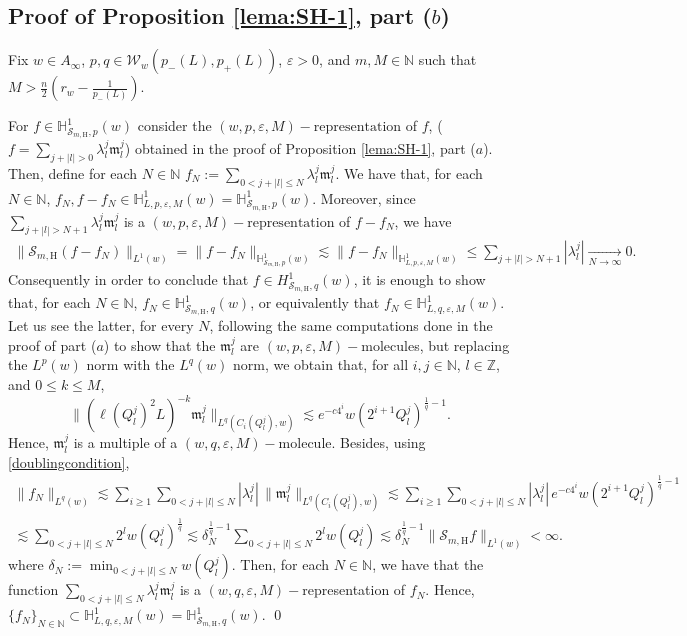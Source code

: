 \documentclass[11pt, a4paper,leqno]{amsart}
\newcommand{\mm}{\mathfrak{m}}
\theoremstyle{plain}
\theoremstyle{definition}
\theoremstyle{remark}
\numberwithin{equation}{section}
\def \N{ \mathbb{N} }
\def \Z{ \mathbb{Z} }
\def \Scal{ \mathcal{S} }
\def \hh{ \mathrm{H} }
\def \mol{ (w,p,\varepsilon,M)-\textrm{molecule}}
\def \p{ (w,p,\varepsilon,M)-\textrm{representation}}
\begin{document}

\subsection{Proof of Proposition \ref{lema:SH-1}, part ($b$)}
Fix $w\in A_{\infty}$, $p,q\in \mathcal{W}_w(p_-(L),p_+(L))$, $\varepsilon>0$, and $m,M\in \N$
such that $M>\frac{n}{2}\left(r_w-\frac{1}{p_-(L)}\right)$.

For $f\in \mathbb{H}^1_{\Scal_{m,\hh},p}(w)$ consider the 
$\p$ of $f$, ($f=\sum_{j+|l|>0}\lambda_l^j\mm_l^j$)
obtained in the proof of Proposition \ref{lema:SH-1}, part ($a$). Then, define for each $N\in \N$
$
f_N:=\sum_{0<j+|l|\leq N}\lambda_l^j\mm_l^j.
$
We have that, for each $N\in \N$, $f_N, f-f_N\in \mathbb{H}^1_{L,p,\varepsilon,M}(w)=\mathbb{H}^1_{\Scal_{m,\hh},p}(w)$. Moreover, since
$\sum_{j+|l|>N+1}\lambda_l^j\mm_l^j$ is a $\p$ of $f-f_N$, we have
\begin{align*}
\|\Scal_{m,\hh}(f-f_N)\|_{L^1(w)}=\|f-f_N\|_{\mathbb{H}^1_{\Scal_{m,\hh},p}(w)}
\lesssim\|f-f_N\|_{\mathbb{H}^1_{L,p,\varepsilon,M}(w)}\leq \sum_{j+|l|>N+1}|\lambda_l^j|\mathop{\longrightarrow}\limits_{N\rightarrow \infty} 0.
\end{align*}
Consequently in order to conclude that $f\in H^1_{\Scal_{m,\hh},q}(w)$, it is enough to show that, for each $N\in \N$, $f_N\in \mathbb{H}^1_{\Scal_{m,\hh},q}(w)$, or equivalently that $f_N\in \mathbb{H}^1_{L,q,\varepsilon,M}(w)$. Let us see the latter,  
for every $N$,  following the same computations done in the proof of part ($a$) to show that the $\mm_l^j$ are $\mol$s, but replacing the $L^p(w)$ norm with the $L^q(w)$ norm, we obtain that, for all $i,j\in \N$, $l\in \Z$, and $0\leq k\leq M$,
$$
\|(\ell(Q_l^j)^2L)^{-k}\mm_l^j\|_{L^q(C_i(Q_l^j),w)}\lesssim e^{-c4^i}w(2^{i+1}Q_l^j)^{\frac{1}{q}-1}.
$$
Hence,  $\mm_l^j$ is a multiple of a $(w,q,\varepsilon,M)-$molecule.
Besides, using \eqref{doublingcondition},
\begin{multline*}
\|f_N\|_{L^q(w)}\lesssim \sum_{i\geq 1}\sum_{0<j+|l|\leq N}|\lambda_l^j|\,\|\mm_l^j\|_{L^q(C_i(Q_l^j),w)}
\lesssim
\sum_{i\geq 1}\sum_{0<j+|l|\leq N}|\lambda_l^j|\, e^{-c4^i}w(2^{i+1}Q_l^j)^{\frac{1}{q}-1}
\\
\lesssim 
\sum_{0<j+|l|\leq N}2^lw(Q_l^j)^{\frac{1}{q}}\lesssim \delta_N^{\frac{1}{q}-1}\sum_{0<j+|l|\leq N}2^lw(Q_l^j)\lesssim \delta_N^{\frac{1}{q}-1} \|\Scal_{m,\hh}f\|_{L^1(w)}<\infty.
\end{multline*}
where $\delta_N:=\min_{0< j+|l|\leq N}w(Q_l^j)$.
Then, for each $N\in \N$, we have that the function $
\sum_{0<j+|l|\leq N}\lambda_l^j\mm_l^j
$ is a $(w,q,\varepsilon,M)-$representation of $f_N$. Hence,
$\{f_N\}_{N\in \N}\subset \mathbb{H}^1_{L,q,\varepsilon,M}(w)=\mathbb{H}^1_{\Scal_{m,\hh},q}(w)$.
\qed
\end{document}
